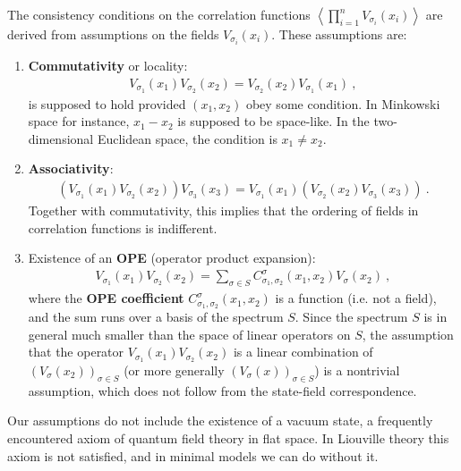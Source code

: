\documentclass[12pt,a4paper,notitlepage]{report}
\newcommand \la {\left\langle}
\newcommand \ra {\right\rangle}
\numberwithin{equation}{section}
\theoremstyle{break}
\begin{document}
The consistency conditions on the correlation functions $\la\prod_{i=1}^n V_{\sigma_i}(x_i)\ra$ are derived from assumptions on the fields $V_{\sigma_i}(x_i)$. These assumptions are:
\begin{enumerate}
 \item \textbf{Commutativity} or locality: 
\begin{align}
 \boxed{V_{\sigma_1}(x_1)V_{\sigma_2}(x_2) = V_{\sigma_2}(x_2) V_{\sigma_1}(x_1)}\ ,
\label{comm}
\end{align}
is supposed to hold provided $(x_1,x_2)$ obey some condition. In Minkowski space for instance, $x_1-x_2$ is supposed to be space-like. In the two-dimensional Euclidean space, the condition is $x_1\neq x_2$.
\item \textbf{Associativity}: 
\begin{align}
 \boxed{\left(V_{\sigma_1}(x_1)V_{\sigma_2}(x_2)\right) V_{\sigma_3}(x_3) = V_{\sigma_1}(x_1)  \left(V_{\sigma_2}(x_2) V_{\sigma_3}(x_3)\right)}\ .
\label{asso}
\end{align}
Together with commutativity, this implies that the ordering of fields in correlation functions is indifferent.
\item Existence of an \textbf{\boldmath OPE} (operator product expansion):
\begin{align}
 \boxed{V_{\sigma_1}(x_1)V_{\sigma_2}(x_2) = \sum_{\sigma\in S} C_{\sigma_1,\sigma_2}^{\sigma}(x_1,x_2) V_{\sigma}(x_2)}\ ,
\label{ope}
\end{align}
where the \textbf{\boldmath OPE coefficient} $C_{\sigma_1,\sigma_2}^{\sigma}(x_1,x_2)$ is a function (i.e. not a field), and the sum runs over a basis of the spectrum $S$. Since the spectrum $S$ is in general much smaller than the space of linear operators on $S$, the assumption that the operator $V_{\sigma_1}(x_1)V_{\sigma_2}(x_2)$ is a linear combination of $(V_{\sigma}(x_2))_{\sigma\in S}$ (or more generally $(V_{\sigma}(x))_{\sigma\in S}$) is a nontrivial assumption, which does not follow from the state-field correspondence.
\end{enumerate}
Our assumptions do not include the existence of a vacuum state, a frequently encountered axiom of quantum field theory in flat space.
In Liouville theory this axiom is not satisfied, and in minimal models we can do without it. 
\end{document}
